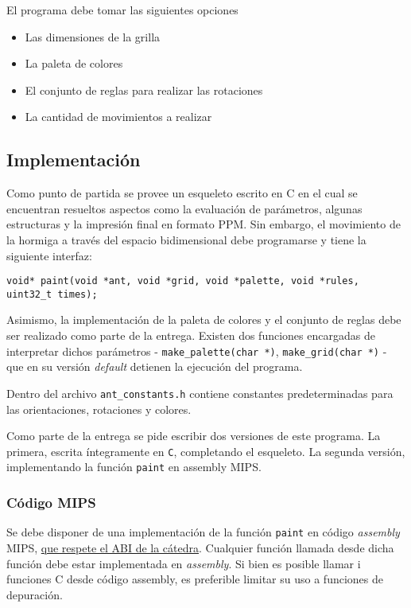\documentclass{article}
\begin{document}
El programa debe tomar las siguientes opciones
\begin{itemize}
\item Las dimensiones de la grilla
\item La paleta de colores
\item El conjunto de reglas para realizar las rotaciones
\item La cantidad de movimientos a realizar
\end{itemize}


\subsection{Implementación}
Como punto de partida se provee un esqueleto escrito en C en el cual se encuentran resueltos aspectos como la evaluación de parámetros, 
algunas estructuras y la impresión final en formato PPM.  Sin embargo, el movimiento de la hormiga a través del
espacio bidimensional debe programarse y tiene la siguiente interfaz:

\begin{small}
\begin{verbatim}
void* paint(void *ant, void *grid, void *palette, void *rules,  uint32_t times);
\end{verbatim}
\end{small}

Asimismo, la implementación de la paleta de colores y el conjunto de reglas debe ser realizado como parte de la entrega. Existen dos funciones
encargadas de interpretar dichos parámetros - \texttt{make\_palette(char *)}, \texttt{make\_grid(char *)} - que en su versión \textit{default}
detienen la ejecución del programa.

Dentro del archivo \texttt{ant\_constants.h} contiene constantes predeterminadas para las orientaciones, rotaciones y colores. 

Como parte de la entrega se pide escribir dos versiones de este programa. La primera, escrita íntegramente en \texttt{C}, completando
el esqueleto. La segunda versión, implementando la función \texttt{paint} en assembly MIPS.

\subsubsection{Código MIPS}
Se debe disponer de una implementación de la función \texttt{paint} en código \textit{assembly} MIPS, \underline{que respete el ABI 
de la cátedra}. Cualquier función llamada desde dicha función debe estar implementada en \textit{assembly}. Si bien es posible llamar i
funciones C desde código assembly, es preferible limitar su uso a funciones de depuración.
\end{document}
